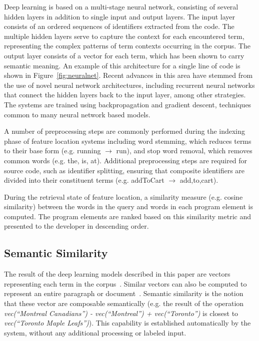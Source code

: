 Deep learning is based on a multi-stage neural network, consisting of
several hidden layers in addition to single input and output layers.
The input layer consists of an ordered sequences of identifiers
extracted from the code. The multiple hidden layers serve to capture
the context for each encountered term, representing the complex
patterns of term contexts occurring in the corpus. The output layer
consists of a vector for each term, which has been shown to carry
semantic meaning. An example of this architecture for a single line of
code is shown in Figure~\ref{fig:neuralnet}. Recent advances in this
area have stemmed from the use of novel neural network architectures,
including recurrent neural networks that connect the hidden layers
back to the input layer, among other strategies. The systems are
trained using backpropagation and gradient descent, techniques common
to many neural network based models.

 
A number of preprocessing steps are commonly performed during the
indexing phase of feature location systems including word stemming,
which reduces terms to their base form (e.g. running $\rightarrow$
run), and stop word removal, which removes common words (e.g. the, is,
at). Additional preprocessing steps are required for source code, such
as identifier splitting, ensuring that composite identifiers are
divided into their constituent terms (e.g. addToCart $\rightarrow$
add,to,cart). 


During the retrieval state of feature location, a similarity measure
(e.g. cosine similarity) between the words in the query and words in
each program element is computed. The program elements are ranked
based on this similarity metric and presented to the developer in
descending order.


\subsection{Semantic Similarity}

The result of the deep learning models described in this paper are
vectors representing each term in the
corpus~\cite{mikolov_distributed_2013}. Similar vectors can also be
computed to represent an entire paragraph or
document~\cite{le_distributed_2014}.  Semantic similarity is the
notion that these vector are composable semantically (e.g. the result
of the operation {\em vec(``Montreal Canadians'') - vec(``Montreal'') +
vec(``Toronto'')} is closest to {\em vec(``Toronto Maple Leafs'')}). This
capability is established automatically by the system, without any
additional processing or labeled input.

